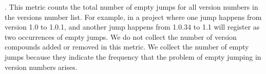 \documentclass[conference]{IEEEtran}
\begin{document}

.  
This metric counts the total number of empty jumps for all version numbers in the versions number list. For example, in a project where one jump happens from version 1.0 to 1.0.1, and another jump happens from 1.0.34 to 1.1 will register as two occurrences of empty jumps.
We do not collect the number of version compounds added or removed in this metric.
We collect the number of empty jumps because they indicate the frequency that the problem of empty jumping in version numbers arises. \\

\end{document}
